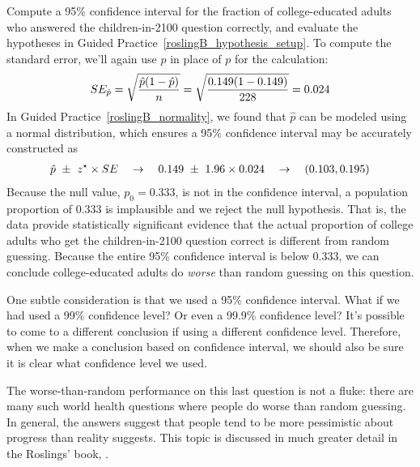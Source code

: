 \begin{examplewrap}
\begin{nexample}{Compute a 95\% confidence interval for the
    fraction of college-educated adults who answered the
    children-in-2100 question correctly, and evaluate the
    hypotheses in Guided
    Practice~\ref{roslingB_hypothesis_setup}.}
  To compute the standard error, we'll again use
  $\hat{p}$
  in place of $p$ for the calculation:
  \begin{align*}
  SE_{\hat{p}}
      = \sqrt{\frac{\hat{p}(1 - \hat{p})}{n}}
      = \sqrt{\frac{0.149{}(1 - 0.149{})}
          {228{}}}
      = 0.024{}
  \end{align*}
  In Guided Practice~\ref{roslingB_normality},
  we found that $\hat{p}$ can be modeled using
  a normal distribution,
  which ensures a 95\% confidence interval may be accurately
  constructed as
  \begin{align*}
  \hat{p}~\pm~z^{\star} \times SE
  \quad\to\quad
  0.149{}~\pm~1.96 \times 0.024{}
  \quad\to\quad
  (0.103, 0.195)
  \end{align*}
  Because the null value, $p_0 = 0.333$, is not in the
  confidence interval, a population proportion of 0.333
  is implausible and we reject the null hypothesis.
  That is, the data provide statistically significant
  evidence that the actual proportion of college adults
  who get the children-in-2100 question correct is
  different from random guessing. Because the entire
  95\% confidence interval
  is below 0.333, we can conclude college-educated adults
  do \emph{worse} than random guessing on this question.

  One subtle consideration is that we used a
  95\% confidence interval.
  What if we had used a 99\% confidence level?
  Or even a 99.9\% confidence level?
  It's possible to come to a different conclusion
  if using a different confidence level.
  Therefore, when we make a conclusion based
  on confidence interval, we should also be sure
  it is clear what confidence level we used.
\end{nexample}
\end{examplewrap}

The worse-than-random performance on this
last question is not a fluke:
there are many such world health questions where people
do worse than random guessing.
In general, the answers suggest that people tend to be
more pessimistic about progress than reality suggests.
This topic is discussed in much greater detail in
the Roslings' book,
\emph{}.


